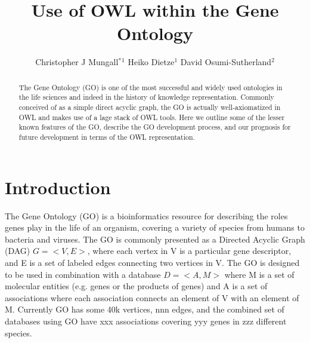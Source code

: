 \documentclass{llncs}
\makeatletter
\def\correspondingauthor{$^*$}
\def\address#1{ \def\@address{\begin{hi}\footnotesize#1\end{hi}}}
\def\iid(#1){\hi$^#1$}
\makeatother
\begin{document}
%
\frontmatter          %

\title{Use of OWL within the Gene Ontology}
\author{
Christopher J Mungall\correspondingauthor$^{1}$
Heiko Dietze$^{1}$
David Osumi-Sutherland$^{2}$
}

\address{%
    \iid(1)Lawrence Berkeley National Laboratory, CA 94720\\
    \iid(2)European Bioinformatics Institute\\
}

\institute{}

\maketitle              %

\begin{abstract}

The Gene Ontology (GO) is one of the most successful and widely used
ontologies in the life sciences and indeed in the history of knowledge
representation. Commonly conceived of as a simple direct acyclic
graph, the GO is actually well-axiomatized in OWL and makes use of a
lage stack of OWL tools. Here we outline some of the lesser known
features of the GO, describe the GO development process, and our
prognosis for future development in terms of the OWL representation.


\end{abstract}

\section{Introduction}

The Gene Ontology (GO) is a bioinformatics resource for describing the
roles genes play in the life of an organism, covering a variety of
species from humans to bacteria and viruses. The GO is commonly
presented as a Directed Acyclic Graph (DAG) $G = <V,E>$, where each
vertex in V is a particular gene descriptor, and E is a set of labeled %
edges connecting two vertices in V. The GO is designed to be used in
combination with a database $D = <A, M>$ where M is a set of molecular
entities (e.g. genes or the products of genes) and A is a set of
associations where each association connects an element of V with an
element of M. Currently GO has some 40k vertices, nnn edges, and the
combined set of databases using GO have xxx associations covering yyy
genes in zzz different species\cite{Blake2013}.
\end{document}
